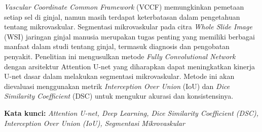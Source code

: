 \begin{abstractind}
\justifying

\textit{Vascular Coordinate Common Framework} (VCCF) memungkinkan pemetaan setiap sel di ginjal, namun masih terdapat keterbatasan dalam pengetahuan tentang mikrovaskular. Segmentasi mikrovaskular pada citra \textit{Whole Slide Image} (WSI) jaringan ginjal manusia merupakan tugas penting yang memiliki berbagai manfaat dalam studi tentang ginjal, termasuk diagnosis dan pengobatan penyakit. Penelitian ini mengusulkan metode \textit{Fully Convolutional Network} dengan arsitektur Attention U-net yang diharapkan dapat meningkatkan kinerja U-net dasar dalam melakukan segmentasi mikrovaskular. Metode ini akan dievaluasi menggunakan metrik \textit{Interception Over Union} (IoU) dan \textit{Dice Similarity Coefficient} (DSC) untuk mengukur akurasi dan konsistensinya.

\bigskip
\noindent
\textbf{Kata kunci:} \textit{Attention U-net, Deep Learning, Dice Similarity Coefficient (DSC), Interception Over Union (IoU), Segmentasi Mikrovaskular}  %
\end{abstractind}

